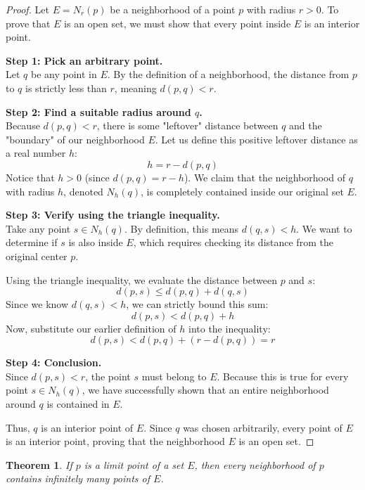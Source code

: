 \documentclass{article}
\theoremstyle{mythm}
\newtheorem{theorem}{Theorem}[section]
\begin{document}
\begin{proof}
Let $E = N_r(p)$ be a neighborhood of a point $p$ with radius $r > 0$. To prove that $E$ is an open set, we must show that every point inside $E$ is an interior point. 

\textbf{Step 1: Pick an arbitrary point.} \\
Let $q$ be any point in $E$. By the definition of a neighborhood, the distance from $p$ to $q$ is strictly less than $r$, meaning $d(p, q) < r$.

\textbf{Step 2: Find a suitable radius around $q$.} \\
Because $d(p, q) < r$, there is some "leftover" distance between $q$ and the "boundary" of our neighborhood $E$. Let us define this positive leftover distance as a real number $h$:
\[ h = r - d(p, q) \]
Notice that $h > 0$ (since $d(p,q) = r - h$). We claim that the neighborhood of $q$ with radius $h$, denoted $N_h(q)$, is completely contained inside our original set $E$.

\textbf{Step 3: Verify using the triangle inequality.} \\
Take any point $s \in N_h(q)$. By definition, this means $d(q, s) < h$. We want to determine if $s$ is also inside $E$, which requires checking its distance from the original center $p$. 

Using the triangle inequality, we evaluate the distance between $p$ and $s$:
\[ d(p, s) \le d(p, q) + d(q, s) \]
Since we know $d(q, s) < h$, we can strictly bound this sum:
\[ d(p, s) < d(p, q) + h \]
Now, substitute our earlier definition of $h$ into the inequality:
\[ d(p, s) < d(p, q) + (r - d(p, q)) = r \]

    
\textbf{Step 4: Conclusion.} \\
Since $d(p, s) < r$, the point $s$ must belong to $E$. Because this is true for every point $s \in N_h(q)$, we have successfully shown that an entire neighborhood around $q$ is contained in $E$. 

Thus, $q$ is an interior point of $E$. Since $q$ was chosen arbitrarily, every point of $E$ is an interior point, proving that the neighborhood $E$ is an open set.
\end{proof}
\begin{theorem}
If $p$ is a limit point of a set $E$, then every neighborhood of $p$ contains infinitely many points of $E$.
\end{theorem}
\end{document}
